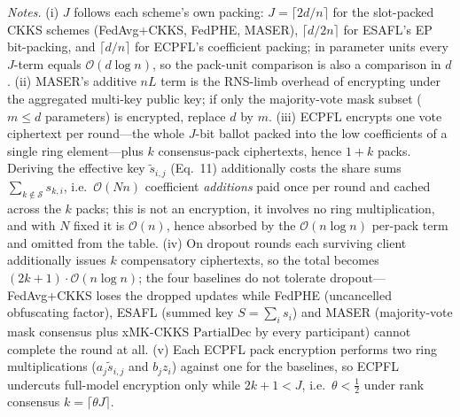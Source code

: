 \begin{table}[t]
\vspace{4pt}
\begin{minipage}{\linewidth}
\footnotesize
\emph{Notes.}
(i) $J$ follows each scheme's own packing: $J=\lceil 2d/n\rceil$ for the
slot-packed CKKS schemes (FedAvg+CKKS, FedPHE, MASER), $\lceil d/2n\rceil$
for ESAFL's EP bit-packing, and $\lceil d/n\rceil$ for ECPFL's coefficient
packing; in parameter units every $J$-term equals $\mathcal{O}(d\log n)$,
so the pack-unit comparison is also a comparison in $d$.
(ii) MASER's additive $nL$ term is the RNS-limb overhead of encrypting
under the aggregated multi-key public key; if only the majority-vote mask
subset ($m\le d$ parameters) is encrypted, replace $d$ by $m$.
(iii) ECPFL encrypts one vote ciphertext per round---the whole $J$-bit
ballot packed into the low coefficients of a single ring element---plus $k$
consensus-pack ciphertexts, hence $1+k$ packs. Deriving the effective key
$\tilde{s}_{i,j}$ (Eq.~11) additionally costs the share sums
$\sum_{k\notin\mathcal{S}}s_{k,i}$, i.e.\ $\mathcal{O}(Nn)$ coefficient
\emph{additions} paid once per round and cached across the $k$ packs; this
is not an encryption, it involves no ring multiplication, and with $N$
fixed it is $\mathcal{O}(n)$, hence absorbed by the
$\mathcal{O}(n\log n)$ per-pack term and omitted from the table.
(iv) On dropout rounds each surviving client additionally issues $k$
compensatory ciphertexts, so the total becomes
$(2k{+}1)\cdot\mathcal{O}(n\log n)$; the four baselines do
not tolerate dropout---FedAvg+CKKS loses the dropped updates while FedPHE
(uncancelled obfuscating factor), ESAFL (summed key $S=\sum_i s_i$) and
MASER (majority-vote mask consensus plus xMK-CKKS $\mathrm{PartialDec}$ by
every participant) cannot complete the round at all.
(v) Each ECPFL pack encryption performs two ring multiplications
($a_j\tilde{s}_{i,j}$ and $b_j z_i$) against one for the baselines, so
ECPFL undercuts full-model encryption only while $2k+1<J$, i.e.\
$\theta<\tfrac12$ under rank consensus $k=\lceil\theta J\rceil$.
\end{minipage}
\end{table}
